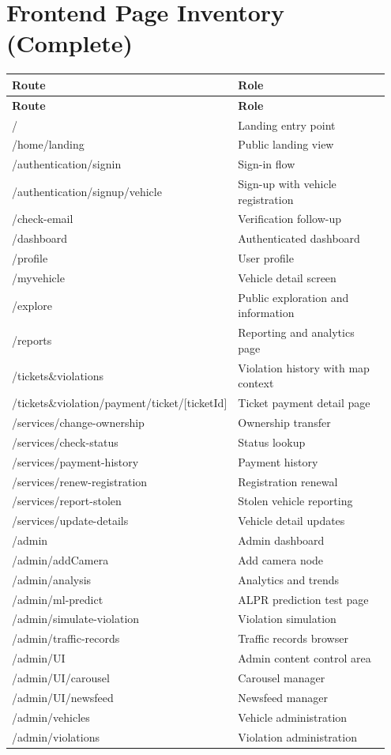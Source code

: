 \documentclass[12pt]{article}
\begin{document}
\section{Frontend Page Inventory (Complete)}
\begin{longtable}{p{0.32\linewidth} p{0.63\linewidth}}
\toprule
\textbf{Route} & \textbf{Role} \\
\midrule
\endfirsthead
\toprule
\textbf{Route} & \textbf{Role} \\
\midrule
\endhead
/ & Landing entry point \\
/home/landing & Public landing view \\
/authentication/signin & Sign-in flow \\
/authentication/signup/vehicle & Sign-up with vehicle registration \\
/check-email & Verification follow-up \\
/dashboard & Authenticated dashboard \\
/profile & User profile \\
/myvehicle & Vehicle detail screen \\
/explore & Public exploration and information \\
/reports & Reporting and analytics page \\
/tickets\&violations & Violation history with map context \\
/tickets\&violation/payment/ticket/[ticketId] & Ticket payment detail page \\
/services/change-ownership & Ownership transfer \\
/services/check-status & Status lookup \\
/services/payment-history & Payment history \\
/services/renew-registration & Registration renewal \\
/services/report-stolen & Stolen vehicle reporting \\
/services/update-details & Vehicle detail updates \\
/admin & Admin dashboard \\
/admin/addCamera & Add camera node \\
/admin/analysis & Analytics and trends \\
/admin/ml-predict & ALPR prediction test page \\
/admin/simulate-violation & Violation simulation \\
/admin/traffic-records & Traffic records browser \\
/admin/UI & Admin content control area \\
/admin/UI/carousel & Carousel manager \\
/admin/UI/newsfeed & Newsfeed manager \\
/admin/vehicles & Vehicle administration \\
/admin/violations & Violation administration \\
\bottomrule
\end{longtable}
\end{document}
